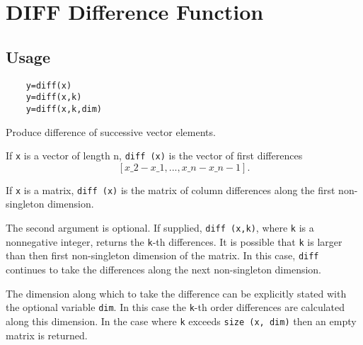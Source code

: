 \section{DIFF Difference Function}

\subsection{Usage}

\begin{verbatim}
	y=diff(x)
	y=diff(x,k)
	y=diff(x,k,dim)
\end{verbatim}
 Produce difference of successive vector elements.
 
 If \verb|x| is a vector of length n, \verb|diff (x)| is the
 vector of first differences
 \[
  [x\_2 - x\_1, ..., x\_n - x\_{n-1}].
 \]

 If \verb|x| is a matrix, \verb|diff (x)| is the matrix of column
 differences along the first non-singleton dimension.

 The second argument is optional.  If supplied, \verb|diff (x,k)|,
 where \verb|k| is a nonnegative integer, returns the
 \verb|k|-th differences. It is possible that \verb|k| is larger than
 then first non-singleton dimension of the matrix. In this case,
 \verb|diff| continues to take the differences along the next
 non-singleton dimension.

 The dimension along which to take the difference can be explicitly
 stated with the optional variable \verb|dim|. In this case the 
 \verb|k|-th order differences are calculated along this dimension.
 In the case where \verb|k| exceeds \verb|size (x, dim)|
 then an empty matrix is returned.

